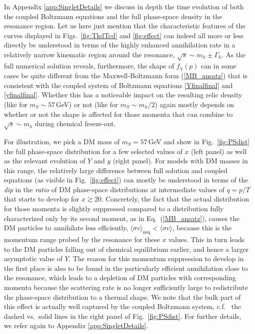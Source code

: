 \documentclass[twocolumn,showpacs,amsmath,amssymb,superscriptaddress,nofootinbib]{revtex4-1}
\begin{document}
In Appendix \ref{app:SingletDetails} we discuss in depth the time evolution of both
the coupled Boltzmann equations and the full phase-space density in the resonance
region. Let us here just mention that the characteristic features of the curves displayed in 
Figs.~\ref{fig:TkdTcd} and \ref{fig:effect}
can indeed all more or less directly be understood in terms of the highly enhanced annihilation rate in a 
relatively narrow kinematic region around the resonance, $\sqrt{s}\sim m_h\pm\Gamma_h$.
As the full numerical solution reveals, furthermore, the shape of $f_\chi(p)$ can in some cases be quite 
different from the Maxwell-Boltzmann form (\ref{MB_ansatz}) that is consistent with the
coupled system of Boltzmann equations \eqref{Yfinalfinal} and \eqref{yfinalfinal}. 
Whether this has a noticeable impact on the resulting relic density (like for $m_S\sim57$\,GeV) 
or not (like for $m_S\sim m_h/2$) again mostly depends on whether or not the shape is affected for 
those momenta that can combine to  $\sqrt{s}\sim m_h$ during chemical freeze-out. 

For illustration, we pick a DM mass of $m_S=57$\,GeV and show in Fig.~\ref{fig:PSdist} the full 
phase-space distribution for  a few selected values of $x$ (left panel) as well as the relevant 
evolution of $Y$ and $y$ (right panel). For models with DM masses in this range, 
the relatively large difference between full solution and coupled equations (as visible in 
Fig.~\ref{fig:effect}) can mostly be understood in terms of the {\it dip} in the {\it ratio} of DM 
phase-space distributions at intermediate values of $q=p/T$ that starts to develop for $x\gtrsim20$.
Concretely, the fact that the actual distribution for those momenta is slightly suppressed 
compared to a distribution fully characterized only by its second moment, as in Eq.~(\ref{MB_ansatz}),
 causes the DM particles to annihilate less efficiently, 
 $\langle \sigma v\rangle_\mathrm{neq} < \langle \sigma v\rangle$, because this is
 the momentum range probed by the resonance for these $x$ values.  
 This in turn leads  to the DM particles falling out of chemical 
equilibrium earlier, and hence a larger asymptotic value of $Y$. The reason for this momentum
suppression to develop in the first place is also to be found in the particularly efficient annihilation
close to the resonance, which leads to a depletion of DM particles with corresponding momenta
because the scattering rate is no longer sufficiently large to redistribute the phase-space distribution
to a thermal shape. We note that the bulk part of this effect is actually 
well captured 
by the coupled Boltzmann system, c.f.~%
the dashed vs.~solid lines 
in the right  panel of Fig.~\ref{fig:PSdist}. For further details, 
we refer again to Appendix \ref{app:SingletDetails}.
\end{document}
